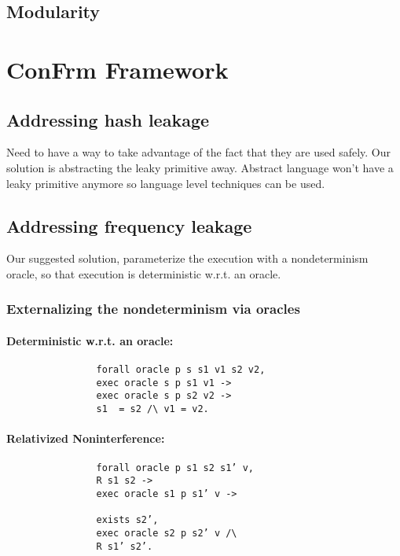 \documentclass[onecolumn]{paper}
\begin{document}
	\subsection{Modularity}
        \newpage

\section{ConFrm Framework}
	\subsection{Addressing hash leakage}
	Need to have a way to take advantage of the fact that they are used safely.
	Our solution is abstracting the leaky primitive away.
	Abstract language won’t have a leaky primitive anymore so language level techniques can be used.

	\subsection{Addressing frequency leakage}
	Our suggested solution, parameterize the execution with a nondeterminism oracle, so that execution is deterministic w.r.t. an oracle.
		
		\subsubsection{Externalizing the nondeterminism via oracles}
			\paragraph{Deterministic w.r.t. an oracle:}
			\begin{verbatim}
				forall oracle p s s1 v1 s2 v2,
				exec oracle s p s1 v1 ->
				exec oracle s p s2 v2 ->
				s1  = s2 /\ v1 = v2.
			\end{verbatim}
	
			\paragraph{Relativized Noninterference:}
			\begin{verbatim}
				forall oracle p s1 s2 s1’ v,
				R s1 s2 ->
				exec oracle s1 p s1’ v ->
				
				exists s2’,
				exec oracle s2 p s2’ v /\
				R s1’ s2’.
			\end{verbatim}
						
\end{document}

